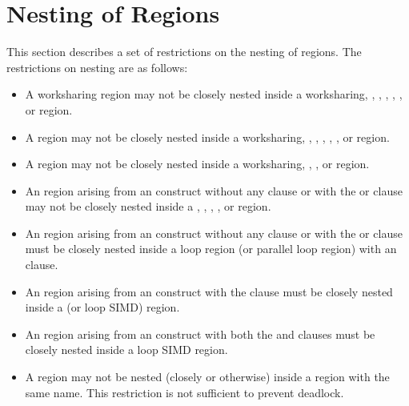 {{{{\section{Nesting of Regions}
\label{sec:Nesting of Regions}
This section describes a set of restrictions on the nesting of regions. The restrictions on 
nesting are as follows:

\begin{itemize}
\item A worksharing region may not be closely nested inside a worksharing, , ,
, , , or  region.

\item A  region may not be closely nested inside a worksharing, , ,
, , , or  region.

\item A  region may not be closely nested inside a worksharing,
, , or  region.

\item An  region arising from an  construct without
any clause or with the  or  clause may not be closely
nested inside a , , , ,
or  region. 

\item An  region arising from an  construct without
any clause or with the  or  clause must be closely nested
inside a loop region (or parallel loop region) with an  clause.

\item An  region arising from an  construct with the
 clause must be closely nested inside a  (or loop SIMD)
region.

\item An  region arising from an  construct with
  both the  and  clauses must be closely nested inside
  a loop SIMD region.

\item A  region may not be nested (closely or otherwise) inside a  
region with the same name. This restriction is not sufficient to prevent 
deadlock.


\end{itemize}}}}}
